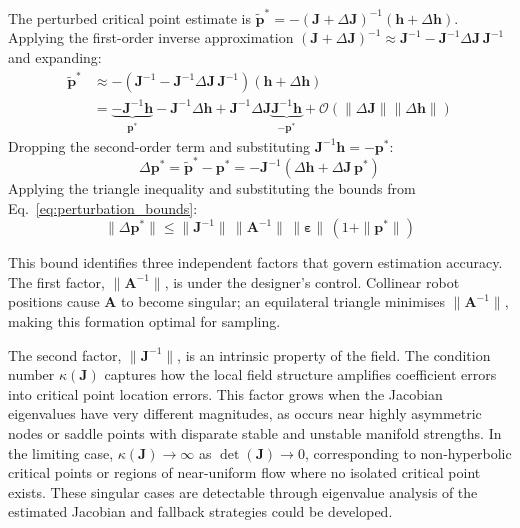 \documentclass[lettersize,journal]{IEEEtran}
\begin{document}
The perturbed critical point estimate is $\tilde{\mathbf{p}}^* = -(\mathbf{J} + \Delta\mathbf{J})^{-1}(\mathbf{h} + \Delta\mathbf{h})$. Applying the first-order inverse approximation $(\mathbf{J} + \Delta\mathbf{J})^{-1} \approx \mathbf{J}^{-1} - \mathbf{J}^{-1}\Delta\mathbf{J}\,\mathbf{J}^{-1}$ and expanding:
\begin{align}
    \tilde{\mathbf{p}}^* &\approx -(\mathbf{J}^{-1} - \mathbf{J}^{-1}\Delta\mathbf{J}\,\mathbf{J}^{-1})(\mathbf{h} + \Delta\mathbf{h}) \nonumber \\
    &= \underbrace{-\mathbf{J}^{-1}\mathbf{h}}_{\mathbf{p}^*} - \mathbf{J}^{-1}\Delta\mathbf{h} + \mathbf{J}^{-1}\Delta\mathbf{J}\underbrace{\mathbf{J}^{-1}\mathbf{h}}_{-\mathbf{p}^*} + \mathcal{O}(\|\Delta\mathbf{J}\|\|\Delta\mathbf{h}\|) \nonumber
\end{align}
Dropping the second-order term and substituting $\mathbf{J}^{-1}\mathbf{h} = -\mathbf{p}^*$:
\begin{equation}
    \Delta\mathbf{p}^* = \tilde{\mathbf{p}}^* - \mathbf{p}^* = -\mathbf{J}^{-1}\!\left(\Delta\mathbf{h} + \Delta\mathbf{J}\,\mathbf{p}^*\right)
    \label{eq:first_order_error}
\end{equation}
Applying the triangle inequality and substituting the bounds from Eq.~\eqref{eq:perturbation_bounds}:
\begin{equation}
    \|\Delta\mathbf{p}^*\| \leq \|\mathbf{J}^{-1}\|\,\|\mathbf{A}^{-1}\|\,\|\boldsymbol{\varepsilon}\|\,(1 + \|\mathbf{p}^*\|)
    \label{eq:sensitivity}
\end{equation}

This bound identifies three independent factors that govern estimation accuracy. The first factor, $\|\mathbf{A}^{-1}\|$, is under the designer's control. Collinear robot positions cause $\mathbf{A}$ to become singular; an equilateral triangle minimises $\|\mathbf{A}^{-1}\|$, making this formation optimal for sampling.

The second factor, $\|\mathbf{J}^{-1}\|$, is an intrinsic property of the field. The condition number $\kappa(\mathbf{J})$ captures how the local field structure amplifies coefficient errors into critical point location errors. This factor grows when the Jacobian eigenvalues have very different magnitudes, as occurs near highly asymmetric nodes or saddle points with disparate stable and unstable manifold strengths. In the limiting case, $\kappa(\mathbf{J}) \to \infty$ as $\det(\mathbf{J}) \to 0$, corresponding to non-hyperbolic critical points or regions of near-uniform flow where no isolated critical point exists. These singular cases are detectable through eigenvalue analysis of the estimated Jacobian and fallback strategies could be developed.
\end{document}
